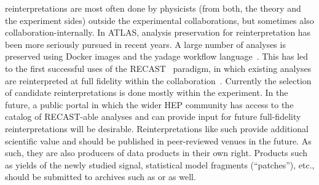 \documentclass[11pt]{article}
\begin{document}

\Glspl{reinterpretation} are most often done by physicists (from both, the theory and the experiment sides) outside the experimental collaborations, but sometimes also collaboration-internally. 
In \gls{ATLAS}, \gls{analysis preservation} for reinterpretation has been more seriously pursued in recent years. A large number of analyses is preserved using Docker images and the yadage workflow language~\cite{Cranmer:2017frf,Cranmer_2015}. This has led to the first successful uses of the RECAST~\cite{Cranmer:2010hk} paradigm, in which existing analyses are reinterpreted at full fidelity within the collaboration~\cite{RECAST1, RECAST2, RECAST3}. Currently the selection of candidate reinterpretations is done mostly within the experiment. In the future, a public portal in which the wider \gls{HEP} community has access to the catalog of RECAST-able analyses and can provide input for future full-fidelity reinterpretations will be desirable. Reinterpretations like such provide additional scientific value and should be published in peer-reviewed venues in the future. As such, they are also producers of \glspl{data product} in their own right. Products such as yields of the newly studied signal, statistical model fragments (``patches''), etc., should be submitted to archives such as \hepdata or \zenodo as well.
\end{document}

